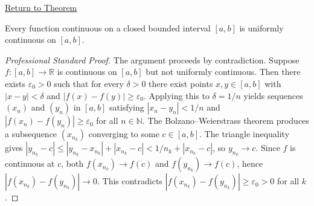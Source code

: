 \newpage
{}
\label{prf:heine-cantor}

\begin{remark*}[Return]
\hyperref[thm:heine-cantor]{Return to Theorem}
\end{remark*}

\begin{theorem*}
Every function continuous on a closed bounded interval $[a,b]$ is uniformly continuous on $[a,b]$.
\end{theorem*}

\begin{proof}[Professional Standard Proof]
\LRAProofBodyStart
The argument proceeds by contradiction. Suppose $f \colon [a,b] \to \mathbb{R}$ is continuous on $[a,b]$ but not uniformly continuous. Then there exists $\varepsilon_{0} > 0$ such that for every $\delta > 0$ there exist points $x, y \in [a,b]$ with $|x - y| < \delta$ and $|f(x) - f(y)| \geq \varepsilon_{0}$. Applying this to $\delta = 1/n$ yields sequences $(x_{n})$ and $(y_{n})$ in $[a,b]$ satisfying $|x_{n} - y_{n}| < 1/n$ and $|f(x_{n}) - f(y_{n})| \geq \varepsilon_{0}$ for all $n \in \mathbb{N}$. The Bolzano--Weierstrass theorem produces a subsequence $(x_{n_{k}})$ converging to some $c \in [a,b]$. The triangle inequality gives $|y_{n_{k}} - c| \leq |y_{n_{k}} - x_{n_{k}}| + |x_{n_{k}} - c| < 1/n_{k} + |x_{n_{k}} - c|$, so $y_{n_{k}} \to c$. Since $f$ is continuous at $c$, both $f(x_{n_{k}}) \to f(c)$ and $f(y_{n_{k}}) \to f(c)$, hence $|f(x_{n_{k}}) - f(y_{n_{k}})| \to 0$. This contradicts $|f(x_{n_{k}}) - f(y_{n_{k}})| \geq \varepsilon_{0} > 0$ for all $k$.
\end{proof}

